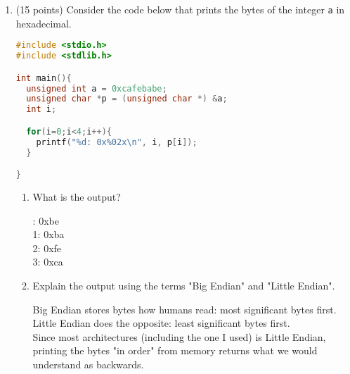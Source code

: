 \documentclass{article}[9pt]
\newenvironment{answerfont}{\fontfamily{qhv}\selectfont}{\par}
\newenvironment{myanswer}{\begin{mdframed}\begin{answerfont}}{\end{answerfont}\end{mdframed}}
\begin{document}
\begin{enumerate}
\begin{lstlisting}[language=c]
    mytypes[i]->size = i;
  }

  return mytypes;
}

void deallocate(mytype_t ** mytypes){

  /*Complete me*/

}

int main(){
  int i,j;
  mytype_t ** mytypes;

  mytypes = allocate(10);


  for(i=0;i<10;i++){
    printf("mytpyes[%d] = [",i);
    for(j=0;j<mytypes[i]->size;j++){
      printf(" %d", mytypes[i]->a[j]);
    }
    printf(" ]\n");
  }

  deallocate(mytypes);
}
\end{lstlisting}

\begin{myanswer}
\begin{lstlisting}[language=c]
void deallocate(mytype_t ** mytypes){

  for (int i = 0; i < 10; i++) {
    free(mytypes[i]->a);
  }
  free(mytypes);
}
\end{lstlisting}
\end{myanswer}


\item (15 points) Consider the code below that prints the bytes of the integer \texttt{a}
in hexadecimal. 

\begin{lstlisting}[language=c]
#include <stdio.h>
#include <stdlib.h>

int main(){
  unsigned int a = 0xcafebabe;
  unsigned char *p = (unsigned char *) &a;
  int i;

  for(i=0;i<4;i++){
    printf("%d: 0x%02x\n", i, p[i]);
  }

}
\end{lstlisting}


\begin{enumerate}
\item What is the output?

\begin{myanswer}
0: 0xbe\\
1: 0xba\\
2: 0xfe\\
3: 0xca
\end{myanswer}

\item Explain the output using the terms "Big Endian" and "Little Endian".

\begin{myanswer}
Big Endian stores bytes how humans read: most significant bytes first.\\
Little Endian does the opposite: least significant bytes first.\\
Since most architectures (including the one I used) is Little Endian,
printing the bytes "in order" from memory returns what we would
understand as backwards.
\end{myanswer}

\end{enumerate}
\end{enumerate}
\end{document}
